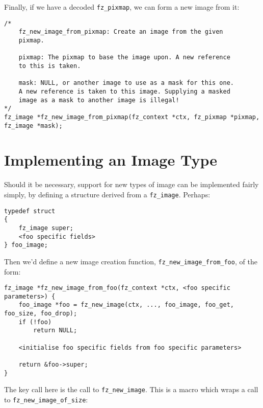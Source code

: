 \documentclass[oneside]{book}
\begin{document}
Finally, if we have a decoded \texttt{fz\_pixmap}, we can form a new image from it:

\begin{lstlisting}
/*
	fz_new_image_from_pixmap: Create an image from the given
	pixmap.

	pixmap: The pixmap to base the image upon. A new reference
	to this is taken.

	mask: NULL, or another image to use as a mask for this one.
	A new reference is taken to this image. Supplying a masked
	image as a mask to another image is illegal!
*/
fz_image *fz_new_image_from_pixmap(fz_context *ctx, fz_pixmap *pixmap, fz_image *mask);
\end{lstlisting}

\section{Implementing an Image Type}

Should it be necessary, support for new types of image can be implemented fairly simply, by defining a structure derived from a \texttt{fz\_image}. Perhaps:

\begin{lstlisting}
typedef struct
{
	fz_image super;
	<foo specific fields>
} foo_image;
\end{lstlisting}

Then we'd define a new image creation function, \texttt{fz\_new\_image\_from\_foo}, of the form:

\begin{lstlisting}
fz_image *fz_new_image_from_foo(fz_context *ctx, <foo specific parameters>) {
	foo_image *foo = fz_new_image(ctx, ..., foo_image, foo_get, foo_size, foo_drop);
	if (!foo)
		return NULL;

	<initialise foo specific fields from foo specific parameters>
	
	return &foo->super;
}
\end{lstlisting}

The key call here is the call to \texttt{fz\_new\_image}. This is a macro which wraps a call to \texttt{fz\_new\_image\_of\_size}:
\end{document}
